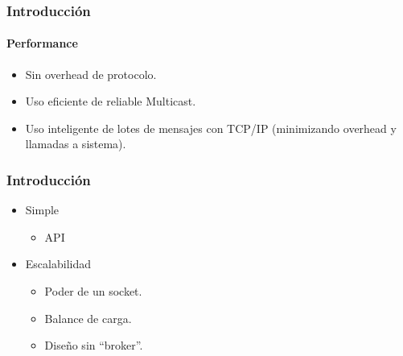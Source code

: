 \begin{frame}
    \frametitle{Introducción}
    \framesubtitle{Performance}
    \begin{itemize}
        \item Sin overhead de protocolo.
        \item Uso eficiente de reliable Multicast.
        \item Uso inteligente de lotes de mensajes con TCP/IP (minimizando overhead y llamadas a sistema).
    \end{itemize}
\end{frame}

\begin{frame}
    \frametitle{Introducción}
    \begin{itemize}
        \item Simple
        \begin{itemize}
            \item API
        \end{itemize}
        \item Escalabilidad
        \begin{itemize}
            \item Poder de un socket.
            \item Balance de carga.
            \item Diseño sin ``broker''.
        \end{itemize}
    \end{itemize}
\end{frame}
